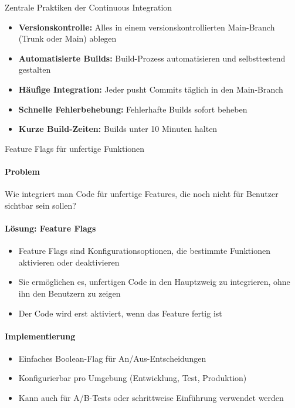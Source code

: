 \begin{concept}{Zentrale Praktiken der Continuous Integration}\\
    \begin{itemize}
        \item \textbf{Versionskontrolle:} Alles in einem versionskontrollierten Main-Branch (Trunk oder Main) ablegen
        \item \textbf{Automatisierte Builds:} Build-Prozess automatisieren und selbsttestend gestalten
        \item \textbf{Häufige Integration:} Jeder pusht Commits täglich in den Main-Branch
        \item \textbf{Schnelle Fehlerbehebung:} Fehlerhafte Builds sofort beheben
        \item \textbf{Kurze Build-Zeiten:} Builds unter 10 Minuten halten
    \end{itemize}
\end{concept}

\begin{KR}{Feature Flags für unfertige Funktionen}\\
    \paragraph{Problem}
    Wie integriert man Code für unfertige Features, die noch nicht für Benutzer sichtbar sein sollen?
    
    \paragraph{Lösung: Feature Flags}
    \begin{itemize}
        \item Feature Flags sind Konfigurationsoptionen, die bestimmte Funktionen aktivieren oder deaktivieren
        \item Sie ermöglichen es, unfertigen Code in den Hauptzweig zu integrieren, ohne ihn den Benutzern zu zeigen
        \item Der Code wird erst aktiviert, wenn das Feature fertig ist
    \end{itemize}
    
    \paragraph{Implementierung}
    \begin{itemize}
        \item Einfaches Boolean-Flag für An/Aus-Entscheidungen
        \item Konfigurierbar pro Umgebung (Entwicklung, Test, Produktion)
        \item Kann auch für A/B-Tests oder schrittweise Einführung verwendet werden
    \end{itemize}
\end{KR}

